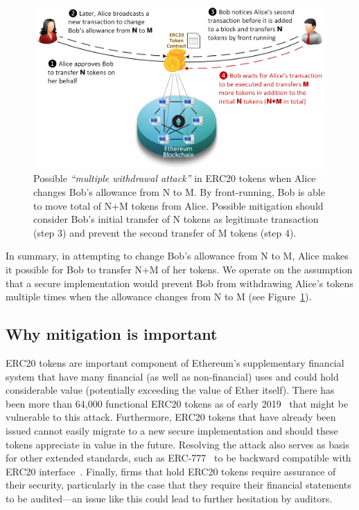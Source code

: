 \begin{figure}[ht]
	\centering
	\includegraphics[width=1.0\linewidth]{figures/multiple_withdrawal_02.png}
	\caption{Possible \textit{``multiple withdrawal attack''} in ERC20 tokens when Alice changes Bob's allowance from N to M. By front-running, Bob is able to move total of N+M tokens from Alice. Possible mitigation should consider Bob's initial transfer of N tokens as legitimate transaction (step 3) and prevent the second transfer of M tokens (step 4).\label{fig:mwa}}
\end{figure}

In summary, in attempting to change Bob's allowance from N to M, Alice makes it possible for Bob to transfer N+M of her tokens. We operate on the assumption that a secure implementation would prevent Bob from withdrawing Alice's tokens multiple times when the allowance changes from N to M (see Figure~\ref{fig:mwa}).

\subsection{Why mitigation is important}
ERC20 tokens are important component of Ethereum's supplementary financial system that have many financial (as well as non-financial) uses and could hold considerable value (potentially exceeding the value of Ether itself). There has been more than 64,000 functional ERC20 tokens as of early 2019~\cite{victormeasuring} that might be vulnerable to this attack. Furthermore, ERC20 tokens that have already been issued cannot easily migrate to a new secure implementation and should these tokens appreciate in value in the future. Resolving the attack also serves as basis for other extended standards, such as ERC-777~\cite{Ref23} to be backward compatible with ERC20 interface~\cite{frowis2018detecting}. Finally, firms that hold ERC20 tokens require assurance of their security, particularly in the case that they require their financial statements to be audited---an issue like this could lead to further hesitation by auditors.

